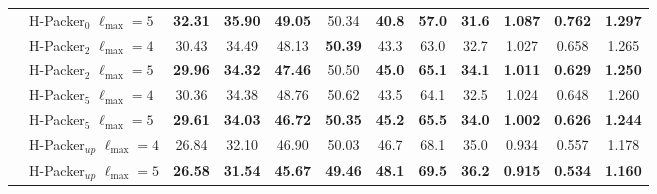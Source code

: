 \begin{table}[t]
{\begin{tabular}{l l c c c c | c c c | c c c}
     & H-Packer$_0$ $\ell_{\text{max}} = 5$    & \textbf{32.31} & \textbf{35.90} & \textbf{49.05} &
     50.34 & \textbf{40.8} & \textbf{57.0} & \textbf{31.6} & \textbf{1.087} & \textbf{0.762} &
     \textbf{1.297} \\
     \cline{2-12}
     & H-Packer$_2$ $\ell_{\text{max}} = 4$    & 30.43 & 34.49 & 48.13 & \textbf{50.39} & 43.3 &
     63.0 & 32.7 & 1.027 & 0.658 & 1.265 \\
     & H-Packer$_2$ $\ell_{\text{max}} = 5$    & \textbf{29.96} & \textbf{34.32} & \textbf{47.46} &
     50.50 & \textbf{45.0} & \textbf{65.1} & \textbf{34.1} & \textbf{1.011} & \textbf{0.629} &
     \textbf{1.250} \\
     \cline{2-12}
     & H-Packer$_5$ $\ell_{\text{max}} = 4$    & 30.36 & 34.38 & 48.76 & 50.62 & 43.5 & 64.1 & 32.5
     & 1.024 & 0.648 & 1.260 \\
     & H-Packer$_5$ $\ell_{\text{max}} = 5$    & \textbf{29.61} & \textbf{34.03} & \textbf{46.72} &
     \textbf{50.35} & \textbf{45.2} & \textbf{65.5} & \textbf{34.0} & \textbf{1.002} &
     \textbf{0.626} & \textbf{1.244} \\
     \cline{2-12}
     & H-Packer$_{up}$ $\ell_{\text{max}} = 4$ & 26.84 & 32.10 & 46.90 & 50.03 & 46.7 & 68.1 & 35.0
     & 0.934 & 0.557 & 1.178 \\
     & H-Packer$_{up}$ $\ell_{\text{max}} = 5$ & \textbf{26.58} & \textbf{31.54} & \textbf{45.67} &
     \textbf{49.46} & \textbf{48.1} & \textbf{69.5} & \textbf{36.2} & \textbf{0.915} &
     \textbf{0.534} & \textbf{1.160} \\
     \hline
    \end{tabular}
    }
    \label{tab:full_ablation_in_lmax}
\end{table}



